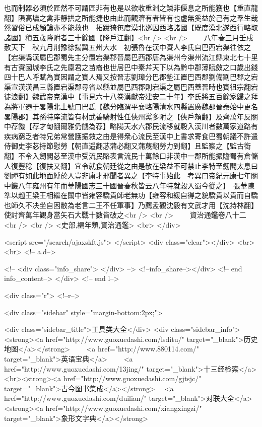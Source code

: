 也而制器必須於匠然不可謂匠非有也是以欲收重淵之鱗非偃息之所能獲也【重直龍翻】隕高墉之禽非靜拱之所能捷也由此而觀濟有者皆有也虚無奚益於己有之羣生哉然習俗已成頠論亦不能救也　拓跋猗㐌度漠北廵因西略諸國【既度漠北遂西行略取諸國】積五歲降附者三十餘國【降戶江翻】<br />
<br />
　　八年春三月壬戍赦天下　秋九月荆豫徐揚冀五州大水　初張魯在漢中賨人李氏自巴西宕渠往依之【宕渠縣漢屬巴郡蜀先主分置宕渠郡晉屬巴西郡唐為渠州今渠州流江縣東北七十里有古賨國城李氏之先廩君之苗裔也世居巴中秦幷天下以為黔中郡薄賦斂之口歲出錢四十巴人呼賦為賨因謂之賨人焉又按晉志劉璋分巴郡墊江置巴西郡劉備割巴郡之宕渠宣漢漢昌三縣置宕渠郡尋省以縣並屬巴西郡則宕渠之屬巴西蓋晉時也賨徂宗翻宕徒浪翻】魏武帝克漢中【事見六十八卷漢獻帝建安二十年】李氏將五百餘家歸之拜為將軍遷于畧陽北土號曰巴氐【魏分臨渭平襄略陽清水四縣置廣魏郡晉泰始中更名畧陽郡】其孫特庠流皆有材武善騎射性任俠州黨多附之【俠戶頰翻】及齊萬年反關中荐饑【荐才甸翻爾雅仍饑為荐】略陽天水六郡民流移就穀入漢川者數萬家道路有疾病窮乏者特兄弟常營護振救之由是得衆心流民至漢中上書求寄食巴蜀朝議不許遣侍御史李苾持節慰勞【朝直遥翻苾蒲必翻又蒲蔑翻勞力到翻】且監察之【監古銜翻】不令入劒閣苾至漢中受流民賂表言流民十萬餘口非漢中一郡所能振贍蜀有倉儲人復豐稔【復扶又翻】宜令就食朝廷從之由是散在梁益不可禁止李特至劒閣太息曰劉禪有如此地面縛於人豈非庸才邪聞者異之【李特事始此　考異曰帝紀元康七年關中饑八年雍州有年而華陽國志三十國晉春秋皆云八年特就穀入蜀今從之】　張華陳準以趙王梁王相繼在關中皆雍容驕貴師老無功【雍容和緩自得之貌驕貴以貴而自驕也師久不决坐自困敝為老言二王不任軍事】乃薦孟觀沈毅有文武才用【沈持林翻】使討齊萬年觀身當矢石大戰十數皆破之<br />
<br />
　　資治通鑑卷八十二<br />
<br />
<史部,編年類,資治通鑑>  <br>
   </div> 

<script src="/search/ajaxskft.js"> </script>
 <div class="clear"></div>
<br>
<br>
 <!-- a.d-->

 <!--
<div class="info_share">
</div> 
-->
 <!--info_share--></div>   <!-- end info_content-->
  </div> <!-- end l-->

<div class="r">   <!--r-->



<div class="sidebar"  style="margin-bottom:2px;">

 
<div class="sidebar_title">工具类大全</div>
<div class="sidebar_info">
<strong><a href="http://www.guoxuedashi.com/lsditu/" target="_blank">历史地图</a></strong>　　
<a href="http://www.880114.com/" target="_blank">英语宝典</a>　　
<a href="http://www.guoxuedashi.com/13jing/" target="_blank">十三经检索</a>　
<br><strong><a href="http://www.guoxuedashi.com/gjtsjc/" target="_blank">古今图书集成</a></strong>　
<a href="http://www.guoxuedashi.com/duilian/" target="_blank">对联大全</a>　<strong><a href="http://www.guoxuedashi.com/xiangxingzi/" target="_blank">象形文字典</a></strong>　


